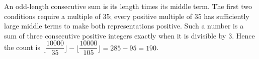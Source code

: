 An odd-length consecutive sum is its length times its middle term. The first two conditions require a multiple of 35; every positive multiple of 35 has sufficiently large middle terms to make both representations positive. Such a number is a sum of three consecutive positive integers exactly when it is divisible by 3. Hence the count is $\lfloor\dfrac{10000}{35}\rfloor-\lfloor\dfrac{10000}{105}\rfloor=285-95=\boxed{190}$.
